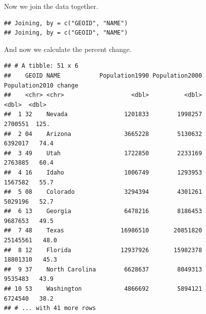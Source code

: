 \documentclass[]{book}
\newenvironment{Shaded}{\begin{snugshade}}{\end{snugshade}}
\newcommand{\DataTypeTok}[1]{\textcolor[rgb]{0.13,0.29,0.53}{#1}}
\newcommand{\DecValTok}[1]{\textcolor[rgb]{0.00,0.00,0.81}{#1}}
\newcommand{\KeywordTok}[1]{\textcolor[rgb]{0.13,0.29,0.53}{\textbf{#1}}}
\newcommand{\NormalTok}[1]{#1}
\newcommand{\OperatorTok}[1]{\textcolor[rgb]{0.81,0.36,0.00}{\textbf{#1}}}
\newcommand{\StringTok}[1]{\textcolor[rgb]{0.31,0.60,0.02}{#1}}
\begin{document}
Now we join the data together.

\begin{Shaded}
\end{Shaded}

\begin{verbatim}
## Joining, by = c("GEOID", "NAME")
## Joining, by = c("GEOID", "NAME")
\end{verbatim}

And now we calculate the percent change.

\begin{Shaded}
\end{Shaded}

\begin{verbatim}
## # A tibble: 51 x 6
##    GEOID NAME           Population1990 Population2000 Population2010 change
##    <chr> <chr>                   <dbl>          <dbl>          <dbl>  <dbl>
##  1 32    Nevada                1201833        1998257        2700551  125. 
##  2 04    Arizona               3665228        5130632        6392017   74.4
##  3 49    Utah                  1722850        2233169        2763885   60.4
##  4 16    Idaho                 1006749        1293953        1567582   55.7
##  5 08    Colorado              3294394        4301261        5029196   52.7
##  6 13    Georgia               6478216        8186453        9687653   49.5
##  7 48    Texas                16986510       20851820       25145561   48.0
##  8 12    Florida              12937926       15982378       18801310   45.3
##  9 37    North Carolina        6628637        8049313        9535483   43.9
## 10 53    Washington            4866692        5894121        6724540   38.2
## # ... with 41 more rows
\end{verbatim}
\end{document}

